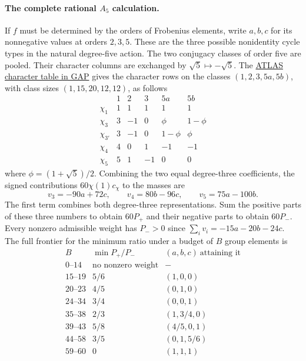 \paragraph{The complete rational $A_5$ calculation.}
If $f$ must be determined by the orders of Frobenius elements, write $a,b,c$ for its nonnegative values at orders $2,3,5$. These are the three possible nonidentity cycle types in the natural degree-five action. The two conjugacy classes of order five are pooled. Their character columns are exchanged by $\sqrt5\mapsto-\sqrt5$. The \href{https://www.math.rwth-aachen.de/~Thomas.Breuer/ctbllib/ctbltoc/data/A5.html}{ATLAS character table in GAP} gives the character rows on the classes $(1,2,3,5a,5b)$, with class sizes $(1,15,20,12,12)$, as follows
\[
 \begin{array}{c|rrrrr}
 &1&2&3&5a&5b\\\hline
 \chi_1&1&1&1&1&1\\
 \chi_3&3&-1&0&\phi&1-\phi\\
 \chi_{3'}&3&-1&0&1-\phi&\phi\\
 \chi_4&4&0&1&-1&-1\\
 \chi_5&5&1&-1&0&0
\end{array}
\]
where $\phi=(1+\sqrt5)/2$. Combining the two equal degree-three coefficients, the signed contributions $60\chi(1)c_\chi$ to the masses are
\[
 v_3=-90a+72c,\qquad v_4=80b-96c,\qquad v_5=75a-100b .
\]
The first term combines both degree-three representations. Sum the positive parts of these three numbers to obtain $60P_+$ and their negative parts to obtain $60P_-$. Every nonzero admissible weight has $P_->0$ since $\sum_i v_i=-15a-20b-24c$. The full frontier for the minimum ratio under a budget of $B$ group elements is
\[
\begin{array}{c|c|c}
 B & \min P_+/P_- & (a,b,c)\ \text{attaining it}\\ \hline
 0\text{--}14 & \text{no nonzero weight} & -\\
 15\text{--}19 & 5/6 &(1,0,0)\\
 20\text{--}23 & 4/5 &(0,1,0)\\
 24\text{--}34 & 3/4 &(0,0,1)\\
 35\text{--}38 & 2/3 &(1,3/4,0)\\
 39\text{--}43 & 5/8 &(4/5,0,1)\\
 44\text{--}58 & 3/5 &(0,1,5/6)\\
 59\text{--}60 & 0 &(1,1,1)
\end{array}
\]
